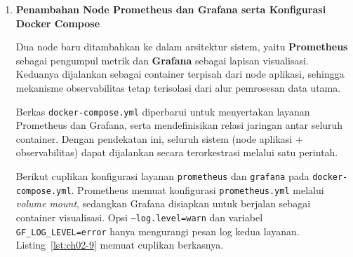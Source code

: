 \begin{enumerate}
\begin{enumerate}
Potongan dari \texttt{web\_server/web\_server.py} ada pada Listing~\ref{lst:ch02-8}.
\begin{lstlisting}[style=PythonStyle, breakatwhitespace=true, caption={Potongan kode pada Tahapan Eksperimen (5)}, label={lst:ch02-8}]
# Prometheus: active clients gauge
MJPEG_CLIENTS.labels(OBS_SERVICE, OBS_INSTANCE).inc()
try:
    # ...
finally:
    MJPEG_CLIENTS.labels(OBS_SERVICE, OBS_INSTANCE).dec()
# ...
FRAMES_IN.labels(OBS_SERVICE, OBS_INSTANCE, SUB_TOPIC_STR).inc()
# ...
# End-to-end latency: capture (Node A) -> ingest here (Node C)
ts_cap = header.get("ts_capture") or header.get("ts")
if ts_cap is not None:
    try:
        E2E_SECONDS.labels(OBS_SERVICE, OBS_INSTANCE).observe(time.time() - float(ts_cap))
    except Exception:
        pass
\end{lstlisting}
\end{enumerate}

Dengan penambahan metrik tersebut, peserta dapat melakukan pengamatan lintas node: misalnya membandingkan laju \texttt{frames\_out\_total} pada Capturer dengan \texttt{frames\_in\_total} pada Transformer, atau mengamati distribusi \texttt{stage\_seconds} untuk mengidentifikasi bottleneck pemrosesan. Kombinasi metrik ini juga memudahkan korelasi antara gejala yang terlihat di dashboard dengan peristiwa runtime pada sistem.


  \item \textbf{Penambahan Node Prometheus dan Grafana serta Konfigurasi Docker Compose}  

Dua node baru ditambahkan ke dalam arsitektur sistem, yaitu \textbf{Prometheus} sebagai pengumpul metrik dan \textbf{Grafana} sebagai lapisan visualisasi. Keduanya dijalankan sebagai container terpisah dari node aplikasi, sehingga mekanisme observabilitas tetap terisolasi dari alur pemrosesan data utama.

Berkas \texttt{docker-compose.yml} diperbarui untuk menyertakan layanan Prometheus dan Grafana, serta mendefinisikan relasi jaringan antar seluruh container. Dengan pendekatan ini, seluruh sistem (node aplikasi + observabilitas) dapat dijalankan secara terorkestrasi melalui satu perintah.


Berikut cuplikan konfigurasi layanan \texttt{prometheus} dan \texttt{grafana} pada \texttt{docker-compose.yml}. Prometheus memuat konfigurasi \texttt{prometheus.yml} melalui \emph{volume mount}, sedangkan Grafana disiapkan untuk berjalan sebagai container visualisasi. Opsi \texttt{--log.level=warn} dan variabel \texttt{GF\_LOG\_LEVEL=error} hanya mengurangi pesan log kedua layanan. Listing~\ref{lst:ch02-9} memuat cuplikan berkasnya.


\end{enumerate}
